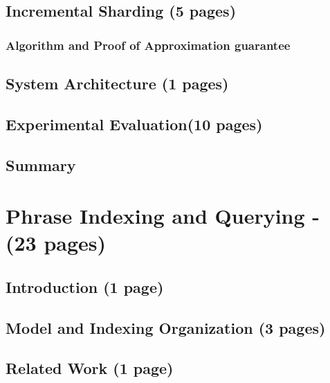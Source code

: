 \documentclass[12pt]{article}
\begin{document}
	\subsection{Incremental Sharding (5 pages)}
		\subsubsection{Algorithm and Proof of Approximation guarantee}

	\subsection{System Architecture (1 pages)}
		
	\subsection{Experimental Evaluation(10 pages)}
		
	

	\subsection{Summary}


\newpage
\section{Phrase Indexing and Querying - (23 pages)}
	
	\subsection{Introduction (1 page)}
		
	\subsection{Model and Indexing Organization (3 pages)}

	\subsection{Related Work (1 page)}
\end{document}
